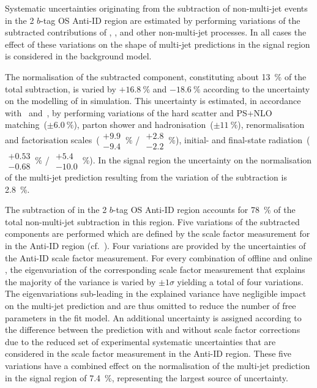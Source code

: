 Systematic uncertainties originating from the subtraction of
non-multi-jet events in the 2 $b$-tag OS Anti-ID region are estimated
by performing variations of the subtracted contributions of
\ttbarTrue, \ttbarFakes, and other non-multi-jet processes. In all
cases the effect of these variations on the shape of multi-jet
predictions in the signal region is considered in the background
model.

The normalisation of the subtracted \ttbarTrue component, constituting
about \SI{13}{\percent} of the total subtraction, is varied by
$+\SI{16.8}{\percent}$ and $-\SI{18.6}{\percent}$ according to the
uncertainty on the modelling of \ttbar in simulation. This uncertainty
is estimated, in accordance with~
and~\cite{ATL-PHYS-PUB-2020-023}, by performing variations of the hard
scatter and PS+NLO matching~($\pm\SI{6.0}{\percent}$), parton shower
and hadronisation~($\pm\SI{11}{\percent}$), renormalisation and
factorisation scales~($\substack{+9.9 \\ -9.4}\,\%$ /
$\substack{+2.8 \\ -2.2}\,\%$), initial- and final-state
radiation~($\substack{+0.53 \\ -0.68}\,\%$ /
$\substack{+5.4 \\ -10.0}\,\%$). In the signal region the uncertainty
on the normalisation of the multi-jet prediction resulting from the
variation of the \ttbarTrue subtraction is \SI{2.8}{\percent}.

The subtraction of \ttbarFakes in the 2 $b$-tag OS Anti-ID region
accounts for \SI{78}{\percent} of the total non-multi-jet subtraction
in this region. Five variations of the subtracted components are
performed which are defined by the scale factor measurement for
\ttbarFakes in the Anti-ID region (cf.\
). Four variations are provided by the
uncertainties of the Anti-ID scale factor measurement. For every
combination of offline and online \tauid, the eigenvariation of the
corresponding scale factor measurement that explains the majority of
the variance is varied by $\pm 1 \sigma$ yielding a total of four
variations. The eigenvariations sub-leading in the explained variance
have negligible impact on the multi-jet prediction and are thus
omitted to reduce the number of free parameters in the fit model. An
additional uncertainty is assigned according to the difference between
the \ttbarFakes prediction with and without scale factor corrections
due to the reduced set of experimental systematic uncertainties that
are considered in the \ttbarFakes scale factor measurement in the
Anti-ID region. These five variations have a combined effect on the
normalisation of the multi-jet prediction in the signal region of
\SI{7.4}{\percent}, representing the largest source of uncertainty.

